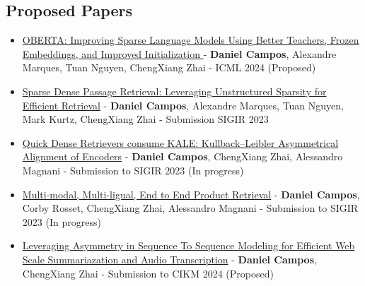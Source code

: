 \documentclass[draftthesis,tocnosub,noragright,centerchapter,fullpagesingle,12pt]{uiuc_csthesis21}
\theoremstyle{definition}
\numberwithin{algocf}{chapter}
\begin{document}
\subsection{Proposed Papers}
\begin{itemize}
\item \href{}{OBERTA: Improving Sparse Language Models Using Better Teachers, Frozen Embeddings, and Improved Initialization } - \textbf{Daniel Campos}, Alexandre Marques, Tuan Nguyen, ChengXiang Zhai - ICML 2024 (Proposed)
\item \href{}{Sparse Dense Passage Retrieval: Leveraging Unstructured Sparsity for Efficient Retrieval} - \textbf{Daniel Campos}, Alexandre Marques, Tuan Nguyen, Mark Kurtz, ChengXiang Zhai - Submission SIGIR 2023
\item \href{}{Quick Dense Retrievers consume KALE: Kullback–Leibler Asymmetrical Alignment
of Encoders} - \textbf{Daniel Campos}, ChengXiang Zhai, Alessandro Magnani - Submission to SIGIR 2023 (In progress)
\item \href{}{Multi-modal, Multi-ligual, End to End Product Retrieval} - \textbf{Daniel Campos}, Corby Rosset, ChengXiang Zhai, Alessandro Magnani - Submission to SIGIR 2023 (In progress)
\item \href{}{Leveraging Asymmetry in Sequence To Sequence Modeling for Efficient Web Scale Summariazation and Audio Transcription} - \textbf{Daniel Campos},  ChengXiang Zhai - Submission to CIKM 2024 (Proposed)
\end{itemize}

 
\appendix
\label{chp:appendix}
 
\backmatter
\end{document}

